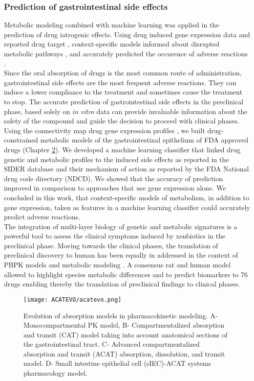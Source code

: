\subsubsection{Prediction of gastrointestinal side effects}
Metabolic modeling combined with machine learning was applied in the prediction of drug iatrogenic effects. Using drug induced gene expression data \cite{subramanian2017next} and reported drug target \cite{knox2010drugbank}, context-specific models informed about disrupted metabolic pathways \cite{zielinski2015pharmacogenomic}, and accurately predicted the occurence of adverse reactions \cite{shaked2016metabolic}.\\
Since the oral absorption of drugs is the most common route of administration, gastrointestinal side effects are the most frequent adverse reactions. They can induce a lower compliance to the treatment and sometimes cause the treatment to stop. The accurate prediction of gastrointestinal side effects in the preclinical phase, based solely on \textit{in vitro} data can provide invaluable information about the safety of the compound and guide the decision to proceed with clinical phases. Using the connectivity map drug gene expression profiles \cite{subramanian2017next}, we built drug-constrained metabolic models of the gastrointestinal epithelium of FDA approved drugs (Chapter \hyperref[ch:chapter2]{2}). We developed a machine learning classifier that linked drug genetic and metabolic profiles to the induced side effects as reported in the SIDER database \cite{campillos2008drug} and their mechanism of action as reported by the FDA National drug code directory (NDCD). We showed that the accuracy of prediction improved in comparison to approaches that use gene expression alone. We concluded in this work, that context-specific models of metabolism, in addition to gene expression, taken as features in a machine learning classifier could accurately predict adverse reactions.\\
The integration of multi-layer biology of genetic and metabolic signatures is a powerful tool to assess the clinical symptoms induced by xenbiotics in the preclinical phase. Moving towards the clinical phases, the translation of preclinical discovery to human has been equally in addressed in the context of PBPK models \cite{thiel2017towards} and metabolic modeling \cite{blais2017reconciled}. A consensus rat and human model \cite{blais2017reconciled} allowed to highlight species metabolic differences and to predict biomarkers to 76 drugs enabling thereby the translation of preclinical findings to clinical phases. 
\begin{figure}[!ht]
\centering
	\texttt{[image: ACATEVO/acatevo.png]}%
	\caption[Evolution of absorption models in pharmacokinetic modeling.]{Evolution of absorption models in pharmacokinetic modeling. A- Monocompartmental PK model, B- Compartmentalized absorption and transit (CAT) model taking into account anatomical sections of the gastrointestinal tract. C- Advanced compartmentalized absorption and transit (ACAT) absorption, dissolution, and transit model. D- Small intestine epithelial cell (sIEC)-ACAT systems pharmacology model.}
	\label{fig:acatevo}
\end{figure}
